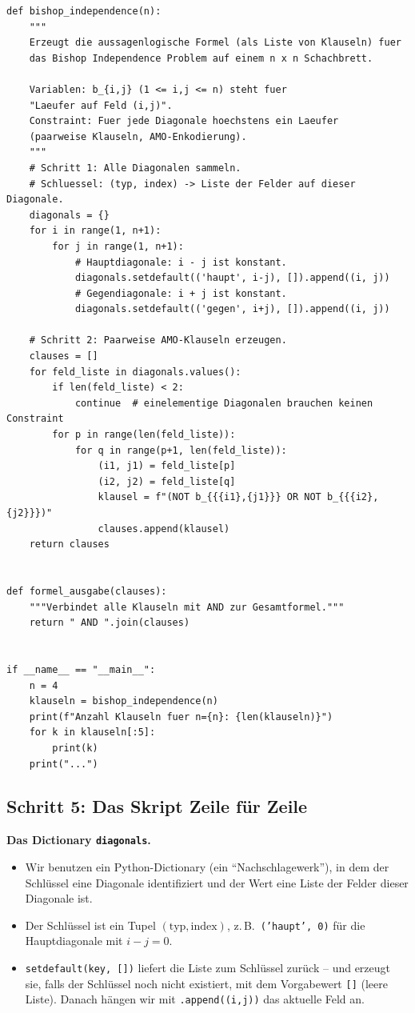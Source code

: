 \documentclass[a4paper,12pt]{article}
\begin{document}
\begin{lstlisting}
def bishop_independence(n):
    """
    Erzeugt die aussagenlogische Formel (als Liste von Klauseln) fuer
    das Bishop Independence Problem auf einem n x n Schachbrett.

    Variablen: b_{i,j} (1 <= i,j <= n) steht fuer
    "Laeufer auf Feld (i,j)".
    Constraint: Fuer jede Diagonale hoechstens ein Laeufer
    (paarweise Klauseln, AMO-Enkodierung).
    """
    # Schritt 1: Alle Diagonalen sammeln.
    # Schluessel: (typ, index) -> Liste der Felder auf dieser Diagonale.
    diagonals = {}
    for i in range(1, n+1):
        for j in range(1, n+1):
            # Hauptdiagonale: i - j ist konstant.
            diagonals.setdefault(('haupt', i-j), []).append((i, j))
            # Gegendiagonale: i + j ist konstant.
            diagonals.setdefault(('gegen', i+j), []).append((i, j))

    # Schritt 2: Paarweise AMO-Klauseln erzeugen.
    clauses = []
    for feld_liste in diagonals.values():
        if len(feld_liste) < 2:
            continue  # einelementige Diagonalen brauchen keinen Constraint
        for p in range(len(feld_liste)):
            for q in range(p+1, len(feld_liste)):
                (i1, j1) = feld_liste[p]
                (i2, j2) = feld_liste[q]
                klausel = f"(NOT b_{{{i1},{j1}}} OR NOT b_{{{i2},{j2}}})"
                clauses.append(klausel)
    return clauses


def formel_ausgabe(clauses):
    """Verbindet alle Klauseln mit AND zur Gesamtformel."""
    return " AND ".join(clauses)


if __name__ == "__main__":
    n = 4
    klauseln = bishop_independence(n)
    print(f"Anzahl Klauseln fuer n={n}: {len(klauseln)}")
    for k in klauseln[:5]:
        print(k)
    print("...")
\end{lstlisting}

\subsection*{Schritt 5: Das Skript Zeile f\"ur Zeile}

\textbf{Das Dictionary \texttt{diagonals}.}
\begin{itemize}[nosep]
\item Wir benutzen ein Python-Dictionary (ein "`Nachschlagewerk"'), in
      dem der Schl\"ussel eine Diagonale identifiziert und der Wert
      eine Liste der Felder dieser Diagonale ist.
\item Der Schl\"ussel ist ein Tupel $(\text{typ}, \text{index})$,
      z.\,B.\ \texttt{('haupt', 0)} f\"ur die Hauptdiagonale mit
      $i - j = 0$.
\item \texttt{setdefault(key, [])} liefert die Liste zum Schl\"ussel
      zur\"uck -- und erzeugt sie, falls der Schl\"ussel noch nicht
      existiert, mit dem Vorgabewert \texttt{[]} (leere Liste). Danach
      h\"angen wir mit \texttt{.append((i,j))} das aktuelle Feld an.
\end{itemize}
\end{document}
